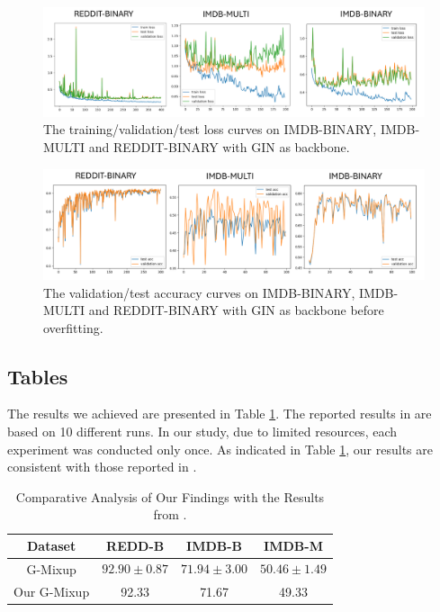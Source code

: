 \documentclass[sigconf, nonacm]{acmart}
\begin{document}
\begin{figure}
  \centering
  \includegraphics[width=\linewidth]{figures/AllLoss.PNG}
  \caption{The training/validation/test loss curves on IMDB-BINARY, IMDB-MULTI and REDDIT-BINARY with GIN as backbone.}
  \label{fig:Loss}
\end{figure}

\begin{figure}
  \centering
  \includegraphics[width=\linewidth]{figures/AllAcc.PNG}
  \caption{The validation/test accuracy curves on IMDB-BINARY, IMDB-MULTI and REDDIT-BINARY with GIN as backbone before overfitting.}
  \label{fig:Acc}
\end{figure}

\subsection{Tables}

The results we achieved are presented in Table \ref{results}. The reported results in \cite{han2022g} are based on 10 different runs. In our study, due to limited resources, each experiment was conducted only once. As indicated in Table \ref{results}, our results are consistent with those reported in \cite{han2022g}.

\begin{table}[t] 
  \caption{Comparative Analysis of Our Findings with the Results from \cite{han2022g}.}
  \label{results}
  \begin{tabular}{cccc}
    \toprule
    Dataset & REDD-B & IMDB-B & IMDB-M \\
    \midrule
    G-Mixup \cite{han2022g} & $$92.90 \pm 0.87$$ & $$71.94 \pm 3.00$$ & $$50.46 \pm 1.49$$ \\
    Our G-Mixup  & 92.33 & 71.67 & 49.33\\
    \bottomrule
  \end{tabular}
\end{table}
\end{document}
